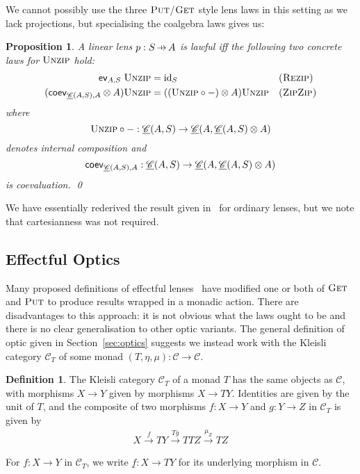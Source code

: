 \documentclass[11pt,letterpaper]{article}
\theoremstyle{plain}
\newtheorem{proposition}[theorem]{Proposition}
\theoremstyle{definition}
\newtheorem{definition}[theorem]{Definition}
\newcommand{\C}{\mathscr{C}}
\newcommand{\homC}{\underline{\C}}
\newcommand{\id}{\mathrm{id}}
\newcommand{\fget}{\textsc{Get}}
\newcommand{\fput}{\textsc{Put}}
\newcommand{\funzip}{\textsc{Unzip}}
\newcommand{\hto}{\ensuremath{\,\mathaccent\shortmid\rightarrow\,}}
\newcommand{\todo}[1]{\textcolor{red}{\small #1}}
\begin{document}
We cannot possibly use the three $\fput$/$\fget$ style lens laws in this setting as we lack projections, but specialising the coalgebra laws gives us:

\begin{proposition}\label{prop:concrete-linear-lawful}
  A linear lens $p : S \hto A$ is lawful iff the following two concrete laws for $\funzip$ hold:
  \begin{align*}
    \ev_{A, S} \; \funzip &= \id_S && \textsc{(Rezip)} \\
    (\coev_{\homC(A, S), A} \otimes A)\funzip &= ((\funzip \circ -) \otimes A)\funzip && \textsc{(ZipZip)}
  \end{align*}
  where \[ \funzip \circ - : \homC(A, S) \to \homC(A, \homC(A, S) \otimes A) \] denotes internal composition and \[\coev_{\homC(A, S), A} : \homC(A, S) \to \homC(A, \homC(A, S) \otimes A)\] is coevaluation.
  \qed
\end{proposition}

We have essentially rederived the result given in~\cite[Section 3.2]{RelatingAlgebraicAndCoalgebraic} for ordinary lenses, but we note that cartesianness was not required.

\subsection{Effectful Optics}
\newcommand{\monact}{\rtimes}

Many proposed definitions of effectful lenses~\cite{ReflectionsOnMonadicLenses} have modified one or both of $\fget$ and $\fput$ to produce results wrapped in a monadic action. There are disadvantages to this approach: it is not obvious what the laws ought to be and there is no clear generalisation to other optic variants. The general definition of optic given in Section~\ref{sec:optics} suggests we instead work with the Kleisli category $\C_T$ of some monad $(T, \eta, \mu) : \C \to \C$.

\begin{definition}
The Kleisli category $\C_T$ of a monad $T$ has the same objects as $\C$, with morphisms $X \to Y$ given by morphisms $X \to TY$. Identities are given by the unit of $T$, and the composite of two morphisms $f : X \to Y$ and $g : Y \to Z$ in $\C_T$ is given by
\begin{align*}
X \xrightarrow{f} TY \xrightarrow{Tg} TTZ \xrightarrow{\mu_Z} TZ
\end{align*}

For $f : X \to Y$ in $\C_T$, we write $\underline{f} : X \to TY$ for its underlying morphism in $\C$.
\end{definition}
\end{document}
